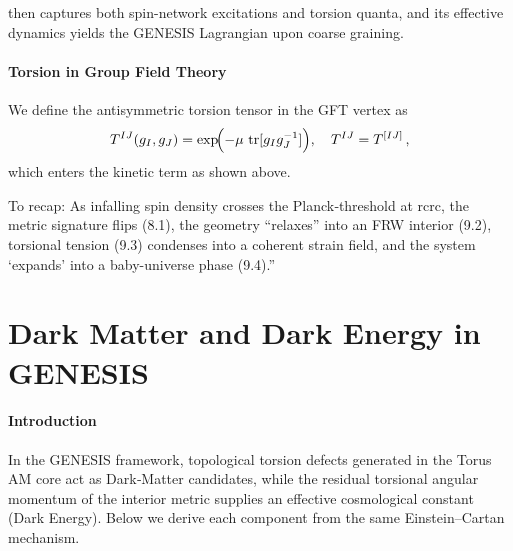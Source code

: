 \documentclass{article}
\DeclareMathOperator{\tr}{tr}
\begin{document}
then captures both spin-network excitations and torsion quanta, and its effective dynamics yields the GENESIS Lagrangian upon coarse graining.


\paragraph{Torsion in Group Field Theory}
We define the antisymmetric torsion tensor in the GFT vertex as
\[
  T^{IJ}(g_I,g_J)
  = \exp\!\Bigl(-\mu\,\tr[g_Ig_J^{-1}]\Bigr),
  \quad T^{IJ}=T^{[IJ]}\,,
\]
which enters the kinetic term as shown above.

To recap: As infalling spin density crosses the Planck‐threshold at rcrc, the metric signature flips (8.1), the geometry “relaxes” into an FRW interior (9.2), torsional tension (9.3) condenses into a coherent strain field, and the system ‘expands’ into a baby-universe phase (9.4).”

\medskip
\begin{center}
\end{center}
\medskip


\section{Dark Matter and Dark Energy in GENESIS}
\label{sec:DM-DE}

\paragraph{Introduction}
In the GENESIS framework, topological torsion defects generated in the Torus AM core act as Dark‐Matter candidates, while the residual torsional angular momentum of the interior metric supplies an effective cosmological constant (Dark Energy).  Below we derive each component from the same Einstein–Cartan mechanism.
\end{document}
